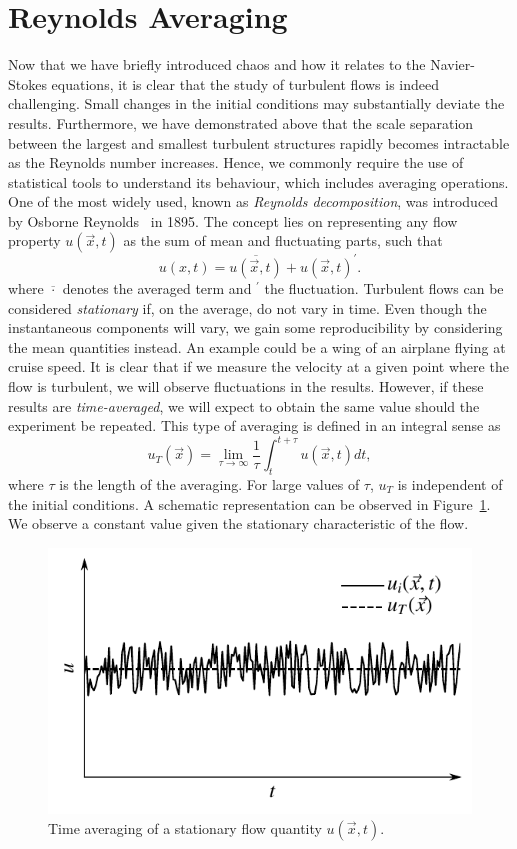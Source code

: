 \section{Reynolds Averaging}
Now that we have briefly introduced chaos and how it relates to the Navier-Stokes equations, it is clear that the study of turbulent flows is indeed challenging. Small changes in the initial conditions may substantially deviate the results. Furthermore, we have demonstrated above that the scale separation between the largest and smallest turbulent structures rapidly becomes intractable as the Reynolds number increases. Hence, we commonly require the use of statistical tools to understand its behaviour, which includes averaging operations. One of the most widely used, known as \textit{Reynolds decomposition}, was introduced by Osborne Reynolds~\cite{} in 1895. The concept lies on representing any flow property $u(\vec{x},t)$ as the sum of mean and fluctuating parts, such that
\begin{equation}
	u(x,t) = \overline{u(\vec{x},t)} + u(\vec{x},t)^\prime.
	\label{eq:reynolds_decomp}
\end{equation}
where $\overline{\cdot}$ denotes the averaged term and $^\prime$ the fluctuation.
Turbulent flows can be considered \textit{stationary} if, on the average, do not vary in time. Even though the instantaneous components will vary, we gain some reproducibility by considering the mean quantities instead. An example could be a wing of an airplane flying at cruise speed. It is clear that if we measure the velocity at a given point where the flow is turbulent, we will observe fluctuations in the results. However, if these results are \textit{time-averaged}, we will expect to obtain the same value should the experiment be repeated. This type of averaging is defined in an integral sense as
\begin{equation}
	u_T(\vec{x}) = \lim_{\tau\rightarrow\infty} \frac{1}{\tau} \int_t^{t+\tau} u(\vec{x},t)dt,
	\label{eq:time_averaging}
\end{equation}
where $\tau$ is the length of the averaging. For large values of $\tau$, $u_T$ is independent of the initial conditions. A schematic representation can be observed in Figure~\ref{fig:time_averaging}. We observe a constant value given the stationary characteristic of the flow.
\begin{figure}[htbp]
	\centering
	\includegraphics[width=0.7\linewidth]{Pictures/ch7_time_averaging}
	\caption{Time averaging of a stationary flow quantity $u(\vec{x},t).$}
	\label{fig:time_averaging}
\end{figure}

